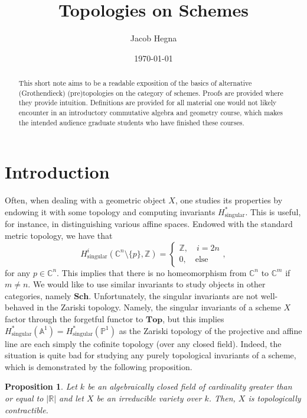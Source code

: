 \documentclass{amsart}
\title{Topologies on Schemes}
\author{Jacob Hegna}
\date{\today}
\newcommand{\Zz}{\mathbb{Z}}
\newcommand{\Sch}{\mathbf{Sch}}
\newtheorem{proposition}[theorem]{Proposition}
\theoremstyle{definition}
\theoremstyle{remark}
\newcommand{\abs}[1] {
  \left| #1 \right|}
\begin{document}
\maketitle

\begin{abstract}
    This short note aims to be a readable exposition of the basics of
    alternative (Grothendieck) (pre)topologies on the category of schemes.
    Proofs are provided where they provide intuition. Definitions are provided
    for all material one would not likely encounter in an introductory
    commutative algebra and geometry course, which makes the intended audience
    graduate students who have finished these courses.
\end{abstract}

\tableofcontents

\section{Introduction}

Often, when dealing with a geometric object $X$, one studies its properties by
endowing it with some topology and computing invariants
$H^\ast_{\text{singular}}$. This is useful, for instance, in distinguishing
various affine spaces. Endowed with the standard metric topology, we have that
\[
    H_{\text{singular}}^i(\mathbb{C}^n \setminus \{p\}, \Zz) =
    \begin{cases}
        \Zz, \quad i = 2n \\
        0, \quad \text{else}
    \end{cases},
\]
for any $p \in \mathbb{C}^n$. This implies that there is no homeomorphism from
$\mathbb{C}^n$ to $\mathbb{C}^m$ if $m \neq n$. We would like to use similar
invariants to study objects in other categories, namely $\Sch$. Unfortunately,
the singular invariants are not well-behaved in the Zariski topology. Namely,
the singular invariants of a scheme $X$ factor through the forgetful functor to
$\mathbf{Top}$, but this implies $H^\ast_\text{singular}(\mathbb{A}^1) =
H^\ast_\text{singular}(\mathbb{P}^1)$ as the Zariski topology of the projective
and affine line are each simply the cofinite topology (over any closed field).
Indeed, the situation is quite bad for studying any purely topological
invariants of a scheme, which is demonstrated by the following proposition.

\begin{proposition}
    Let $k$ be an algebraically closed field of cardinality greater than or
    equal to $\abs{\mathbb{R}}$ and let $X$ be an irreducible variety over $k$.
    Then, $X$ is topologically contractible.
\end{proposition}
\end{document}

